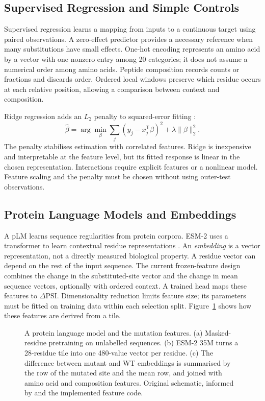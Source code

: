 \subsection{Supervised Regression and Simple Controls}
Supervised regression learns a mapping from inputs to a continuous target using paired observations.
A zero-effect predictor provides a necessary reference when many substitutions have small effects.
One-hot encoding represents an amino acid by a vector with one nonzero entry among 20 categories;
it does not assume a numerical order among amino acids. Peptide composition records counts or
fractions and discards order. Ordered local windows preserve which residue occurs at each relative
position, allowing a comparison between context and composition.

Ridge regression adds an $L_2$ penalty to squared-error fitting \citep{hoerl1970}:
\begin{equation}
 \widehat{\beta}=\arg\min_{\beta}
 \sum_j(y_j-x_j^\mathsf{T}\beta)^2+\lambda\|\beta\|_2^2.
\end{equation}
The penalty stabilises estimation with correlated features. Ridge is inexpensive and interpretable at
the feature level, but its fitted response is linear in the chosen representation. Interactions require
explicit features or a nonlinear model. Feature scaling and the penalty must be chosen without using
outer-test observations.

\subsection{Protein Language Models and Embeddings}
A pLM learns sequence regularities from protein corpora. ESM-2 uses a transformer to learn contextual
residue representations \citep{lin2023esm,vaswani2017}. An \emph{embedding} is a vector representation,
not a directly measured biological property. A residue vector can depend on the rest of the input
sequence. The current frozen-feature design combines the change in the substituted-site vector and
the change in mean sequence vectors, optionally with ordered context. A trained head maps these
features to $\Delta$PSI. Dimensionality reduction limits feature size; its parameters must be fitted on
training data within each selection split. Figure~\ref{fig:plm-embedding} shows how these features
are derived from a tile.

\begin{figure}[htbp]
  \centering
  
  \caption[A protein language model and the mutation features]{A protein language model and the mutation features. (a) Masked-residue pretraining on unlabelled sequences. (b) ESM-2 35M turns a 28-residue tile into one 480-value vector per residue. (c) The difference between mutant and WT embeddings is summarised by the row of the mutated site and the mean row, and joined with amino acid and composition features. Original schematic, informed by \citep{lin2023esm,vaswani2017} and the implemented feature code.}
  \label{fig:plm-embedding}
\end{figure}

